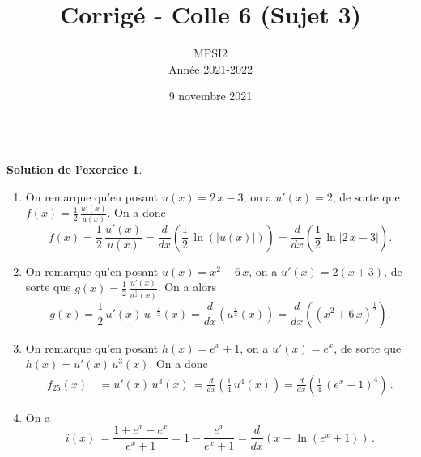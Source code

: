 \documentclass[a4paper, 11pt,openany]{article}%
\title{Corrigé - Colle 6 (Sujet 3)}
\author{MPSI2\\
Année 2021-2022}
\date{9 novembre 2021}
\theoremstyle{plain}
\theoremstyle{definition}
\newtheorem{cours}{Question de cours}
\newtheorem{exo}{Exercice}
\newtheorem{sol}{Solution de l'exercice}
\theoremstyle{remark}
\begin{document}
   \maketitle
      \rule{\linewidth}{0.5mm}



\begin{sol}
\begin{enumerate}
\item On remarque qu'en
posant $u(x)=2\,x-3$, on a $u'(x)= 2$, de sorte que $f(x)=\frac{1}{2}\,\frac{u'(x)}{u(x)}$. On a donc 
\[
f(x)= \frac{1}{2}\,\frac{u'(x)}{u(x)}=\frac{d}{dx} \left(\frac{1}{2}\, \ln
(|u(x)|)\right)=\frac{d}{dx} \left(\frac{1}{2}\,\ln|2\,x-3|\right).
\] 
\item On remarque qu'en posant $u(x)=x^2+6\,x$, on a $u'(x)=2(x+3)$, de sorte que
$g(x)=\frac{1}{2}\,\frac{u'(x)}{u^{\frac{1}{2}}(x)}$. On a alors 
\[
g(x)= \frac{1}{2}\,
u'(x)\,u^{-\frac{1}{2}}(x)=\frac{d}{dx} \left( u^{\frac{1}{2}}(x)\right)
=\frac{d}{dx} \left( (x^2+6\,x)^{\frac{1}{2}}\right).
\]
\item On remarque qu'en posant $h(x)=e^{x}+1$, on a $u'(x)=e^{x}$, de sorte que $h(x)=
u'(x)\, u^3(x)$. On a donc
\begin{align*}
f_{25}(x)\, &= u'(x)\, u^3(x)\,  = \frac{d}{dx}\left(\frac{1}{4}\, u^{4}(x)\right)= 
 \frac{d}{dx}\left(\frac{1}{4}\, (e^{x}+1)^{4}\right)\,.
\end{align*}
\item On a 
\[
i(x)\,  = \frac{1+e^{x}-e^{x}}{e^{x}+1}=1-\frac{e^{x}}{e^{x}+1}=\frac{d}{dx}\left(x-\ln (e^{x}+1)\right)\,.
\]
\end{enumerate}
\end{sol}
\end{document}
